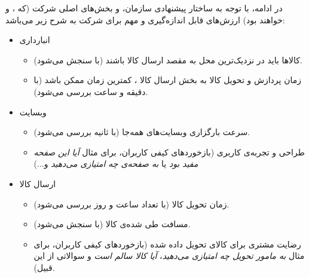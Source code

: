 \documentclass[12pt]{article}
\begin{document}
در ادامه، با توجه به ساختار پیشنهادی سازمان، و بخش‌های اصلی شرکت  (که ، 
و  خواهند بود) ارزش‌های قابل‌ اندازه‌گیری \label{movs}
و مهم برای شرکت  به شرح زیر می‌باشد:
\begin{itemize}
    \item  انبارداری 
    
    \begin{itemize}
        \item 
        کالا‌ها باید در نزدیک‌ترین محل به مقصد ارسال کالا باشند (با سنجش می‌شود).
        
        \item 
        زمان پردازش و تحویل کالا به بخش ارسال کالا ، کمترین زمان ممکن باشد (با دقیقه و ساعت بررسی می‌شود).        
    \end{itemize}

    \item وبسایت  
    \begin{itemize}
        \item سرعت بارگزاری وبسایت‌های  همه‌جا (با ثانیه بررسی می‌شود).
        
         \item 
        طراحی و تجربه‌ی کاربری  (بازخورد‌های کیفی کاربران، برای مثال \textit{آیا این صفحه مفید بود} یا \textit{به صفحه‌ی  چه امتیازی می‌دهید} و...)
    \end{itemize}
    \item ارسال کالا 
    \begin{itemize}
        \item 
        زمان تحویل کالا (با تعداد ساعت و روز بررسی می‌شود).
        \item 
        مسافت طی شده‌ی کالا (با  سنجش می‌شود).
        
        \item 
        رضایت مشتری برای کالای تحویل داده شده (بازخورد‌های کیفی کاربران، برای مثال 
        \textit{به مامور تحویل چه امتیازی می‌دهید}،
        \textit{آیا کالا سالم است} و سوالاتی از این قبیل).
    \end{itemize}
\end{itemize}
\end{document}
